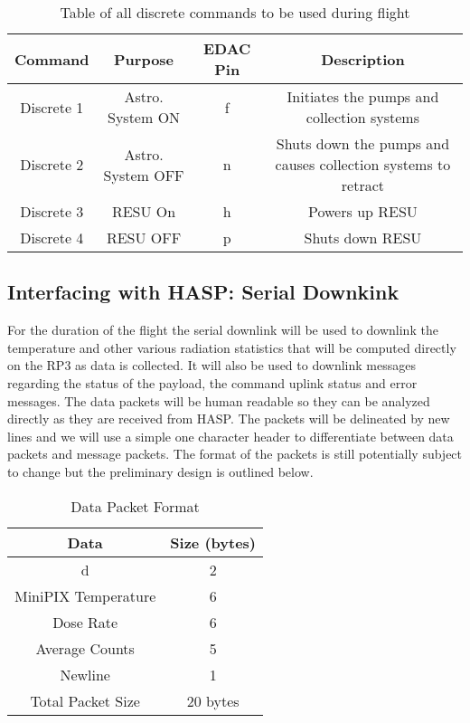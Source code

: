\begin{table}[!ht]
\centering
\caption{Table of all discrete commands to be used during flight} 
\label{tab:Dis-Commands}
\bigskip
\begin{tabular}{|c|c|c|c|}
\hline
\multicolumn{1}{|c|}{\bfseries Command} & \multicolumn{1}{c|}{\bfseries Purpose} &  \multicolumn{1}{c|}{\bfseries EDAC Pin} & \multicolumn{1}{c|}{\bfseries Description} \\
\hline
    Discrete 1     	& Astro. System ON 	& f	 & Initiates the pumps and collection systems   \\ \hline 
    Discrete 2    	& Astro. System OFF 	& n	 &  Shuts down the pumps and causes collection systems to retract  \\ \hline
    Discrete 3  	& RESU On 	& h	 & Powers up RESU   \\ \hline 
    Discrete 4 		& RESU OFF 	& p	 & Shuts down RESU   \\ \hline
\end{tabular}
\medskip
\end{table}

\subsection{Interfacing with HASP: Serial Downkink}
For the duration of the flight the serial downlink will be used to downlink the temperature and other various radiation statistics that will be computed directly on the RP\num{3} as data is collected. It will also be used to downlink messages regarding the status of the payload, the command uplink status and error messages. The data packets will be human readable so they can be analyzed directly as they are received from HASP. The packets will be delineated by new lines and we will use a simple one character header to differentiate between data packets and message packets. The format of the packets is still potentially subject to change but the preliminary design is outlined below.



\begin{table}[!ht]
\centering
\caption{Data Packet Format} 
\label{tab:DataPacket}
\bigskip
\begin{tabular}{|c|c|}
\hline
\multicolumn{1}{|c|}{\bfseries Data} & \multicolumn{1}{c|}{\bfseries Size (bytes)}\\
\hline
    d						& 2		\\ \hline 
    MiniPIX Temperature 			& 6		\\ \hline
    Dose Rate					& 6		\\ \hline %
    Average Counts   				& 5		\\ \hline
    Newline					& 1		\\ \hline
    Total Packet Size				& 20 bytes		\\ \hline
    
\end{tabular}
\medskip
\end{table}

